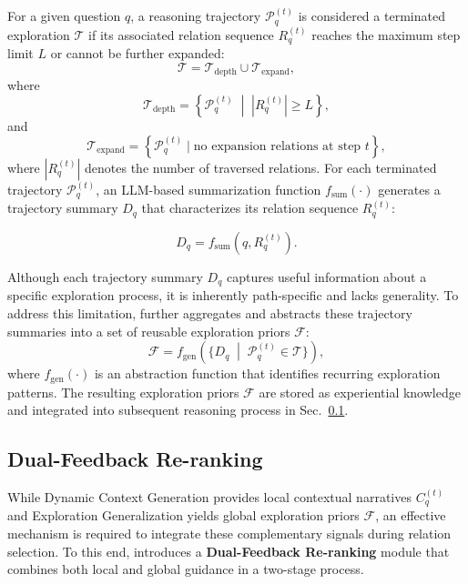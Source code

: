 For a given question $q$, a reasoning trajectory $\mathcal{P}_q^{(t)}$ is considered a terminated exploration $\mathcal{T}$ if its associated relation sequence $R_q^{(t)}$ reaches the maximum step limit $L$ or cannot be further expanded:
\begin{equation}
\mathcal{T} = \mathcal{T}_{\text{depth}} \cup \mathcal{T}_{\text{expand}},
\end{equation}
where
\begin{equation}
\mathcal{T}_{\text{depth}} = \left\{ \mathcal{P}_q^{(t)} \;\middle|\; |R_q^{(t)}| \geq L \right\},
\end{equation}
and
\begin{equation}
\mathcal{T}_{\text{expand}} = \left\{ \mathcal{P}_q^{(t)} \mid \text{no expansion relations at step } t \right\},
\end{equation}
where $|R_q^{(t)}|$ denotes the number of traversed relations. For each terminated trajectory $\mathcal{P}_q^{(t)}$, an LLM-based summarization function $f_{\text{sum}}(\cdot)$ generates a trajectory summary $D_q$ that characterizes its relation sequence $R_q^{(t)}$:

\begin{equation}
D_q = f_{\text{sum}}(q, R_q^{(t)}).
\end{equation}

Although each trajectory summary $D_q$ captures useful information about a specific exploration process, it is inherently path-specific and lacks generality. To address this limitation, \method{} further aggregates and abstracts these trajectory summaries into a set of reusable exploration priors $\mathcal{F}$:
\begin{equation}
\mathcal{F} = f_{\text{gen}}\!\left(\{ D_q \;\middle|\; \mathcal{P}_q^{(t)} \in \mathcal{T} \}\right),
\end{equation}
where $f_{\text{gen}}(\cdot)$ is an abstraction function that identifies recurring exploration patterns. The resulting exploration priors $\mathcal{F}$ are stored as experiential knowledge and integrated into subsequent reasoning process in Sec.~\ref{sec:dual_feedback}.


\subsection{Dual-Feedback Re-ranking}
\label{sec:dual_feedback}
While Dynamic Context Generation provides local contextual narratives $C_q^{(t)}$ and Exploration Generalization yields global exploration priors $\mathcal{F}$, an effective mechanism is required to integrate these complementary signals during relation selection. To this end, \method{} introduces a \textbf{Dual-Feedback Re-ranking} module that combines both local and global guidance in a two-stage process.

